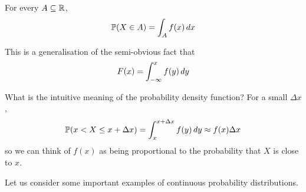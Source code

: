 \documentclass{../template/note}
\begin{document}
    \begin{proposition}
        For every \(A \subseteq \mathbb R\),
        \begin{align*}
            \mathbb P(X \in A) = \int_A f(x) \,d{x}
        \end{align*}
    \end{proposition}
    
    \begin{remark*}
        This is a generalisation of the semi-obvious fact that
        \begin{align*}
            F(x) = \int_{-\infty}^x f(y) \,d{y}
        \end{align*}
    \end{remark*}
    What is the intuitive meaning of the probability density function? For a small \(\Delta x\),
    \begin{align*}
        \mathbb P(x < X \leq x + \Delta x) = \int_x^{x+\Delta x} f(y) \,d{y} \approx f(x) \Delta x
    \end{align*}
    so we can think of \(f(x)\) as being proportional to the probability that \(X\) is close to \(x\).

    Let us consider some important examples of continuous probability distributions.
\end{document}
